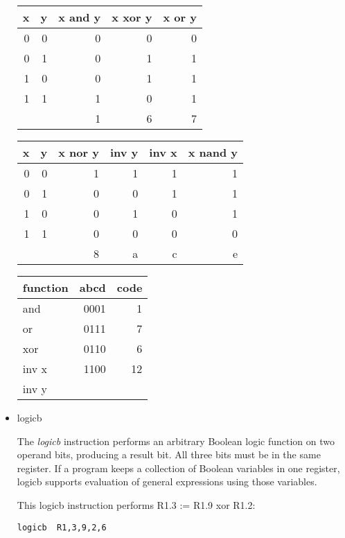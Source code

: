 \documentclass[11pt]{article}
\begin{document}
\begin{itemize}
\begin{center}
\begin{tabular}{rrrrr}
x & y & x and y & x xor y & x or y\\
\hline
0 & 0 & 0 & 0 & 0\\
0 & 1 & 0 & 1 & 1\\
1 & 0 & 0 & 1 & 1\\
1 & 1 & 1 & 0 & 1\\
\hline
 &  & 1 & 6 & 7\\
\hline
\end{tabular}
\end{center}

\begin{center}
\begin{tabular}{rrrrrr}
x & y & x nor y & inv y & inv x & x nand y\\
\hline
0 & 0 & 1 & 1 & 1 & 1\\
0 & 1 & 0 & 0 & 1 & 1\\
1 & 0 & 0 & 1 & 0 & 1\\
1 & 1 & 0 & 0 & 0 & 0\\
\hline
 &  & 8 & a & c & e\\
\hline
\end{tabular}
\end{center}


\begin{center}
\begin{tabular}{lrr}
function & abcd & code\\
\hline
and & 0001 & 1\\
or & 0111 & 7\\
xor & 0110 & 6\\
inv x & 1100 & 12\\
inv y &  & \\
\end{tabular}
\end{center}

\item logicb
\label{sec:org41d7580}

The \emph{logicb} instruction performs an arbitrary Boolean logic function
on two operand bits, producing a result bit.  All three bits must be
in the same register.  If a program keeps a collection of Boolean
variables in one register, logicb supports evaluation of general
expressions using those variables.

This logicb instruction performs R1.3 := R1.9 xor R1.2:

\begin{verbatim}
logicb  R1,3,9,2,6
\end{verbatim}


\end{itemize}
\end{document}
